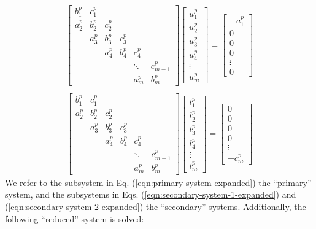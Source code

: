 \begin{align}
& \begin{bmatrix}
b_1^p & c_1^p \\
a_2^p & b_2^p & c_2^p \\
      & a_3^p & b_3^p & c_3^p \\
      &       & a_4^p & b_4^p & c_4^p \\
      &       &       &       &  \ddots & c_{m-1}^p\\
      &       &       &       &     a_{m}^p  & b_{m}^p
\end{bmatrix}
\begin{bmatrix}
u_1^p \\
u_2^p \\
u_3^p \\
u_4^p \\
\vdots \\
u_m^p
\end{bmatrix}
=
\begin{bmatrix}
-a_1^p \\
0 \\
0 \\
0 \\
\vdots \\
0
\end{bmatrix} & \label{eqn:secondary-system-1-expanded} \\
\end{align}
%
\begin{align}
& \begin{bmatrix}
b_1^p & c_1^p \\
a_2^p & b_2^p & c_2^p \\
      & a_3^p & b_3^p & c_3^p \\
      &       & a_4^p & b_4^p & c_4^p \\
      &       &       &       &  \ddots & c_{m-1}^p\\
      &       &       &       &     a_{m}^p  & b_{m}^p
\end{bmatrix}
\begin{bmatrix}
l_1^p \\
l_2^p \\
l_3^p \\
l_4^p \\
\vdots \\
l_m^p
\end{bmatrix}
=
\begin{bmatrix}
0 \\
0 \\
0 \\
0 \\
\vdots \\
-c_m^p
\end{bmatrix} & \label{eqn:secondary-system-2-expanded}
\end{align}
%
We refer to the subsystem in Eq. (\ref{eqn:primary-system-expanded})
the ``primary'' system, and the subsystems in
Eqs. (\ref{eqn:secondary-system-1-expanded}) and
(\ref{eqn:secondary-system-2-expanded})
the ``secondary'' systems.
Additionally, the following ``reduced'' system is solved:

